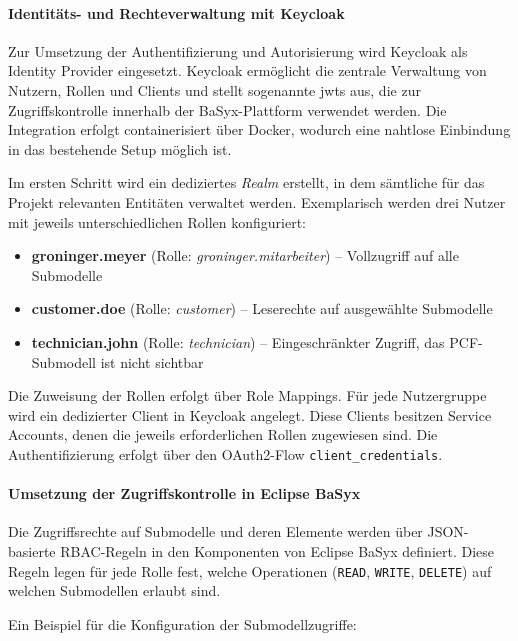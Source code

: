 \paragraph{Identitäts- und Rechteverwaltung mit Keycloak}

Zur Umsetzung der Authentifizierung und Autorisierung wird Keycloak als Identity Provider eingesetzt. Keycloak ermöglicht die zentrale Verwaltung von Nutzern, Rollen und Clients und stellt sogenannte \acsp{jwt} aus, die zur Zugriffskontrolle innerhalb der BaSyx-Plattform verwendet werden. Die Integration erfolgt containerisiert über Docker, wodurch eine nahtlose Einbindung in das bestehende Setup möglich ist.

Im ersten Schritt wird ein dediziertes \textit{Realm} erstellt, in dem sämtliche für das Projekt relevanten Entitäten verwaltet werden. Exemplarisch werden drei Nutzer mit jeweils unterschiedlichen Rollen konfiguriert:

\begin{itemize}[noitemsep, leftmargin=*]
    \item \textbf{groninger.meyer} (Rolle: \textit{groninger.mitarbeiter}) – Vollzugriff auf alle Submodelle
    \item \textbf{customer.doe} (Rolle: \textit{customer}) – Leserechte auf ausgewählte Submodelle
    \item \textbf{technician.john} (Rolle: \textit{technician}) – Eingeschränkter Zugriff, das PCF-Submodell ist nicht sichtbar
\end{itemize}

Die Zuweisung der Rollen erfolgt über Role Mappings. Für jede Nutzergruppe wird ein dedizierter Client in Keycloak angelegt. Diese Clients besitzen Service Accounts, denen die jeweils erforderlichen Rollen zugewiesen sind. Die Authentifizierung erfolgt über den OAuth2-Flow \texttt{client\_credentials}.

\paragraph{Umsetzung der Zugriffskontrolle in Eclipse BaSyx}

Die Zugriffsrechte auf Submodelle und deren Elemente werden über JSON-basierte RBAC-Regeln in den Komponenten von Eclipse BaSyx definiert. Diese Regeln legen für jede Rolle fest, welche Operationen (\texttt{READ}, \texttt{WRITE}, \texttt{DELETE}) auf welchen Submodellen erlaubt sind.

Ein Beispiel für die Konfiguration der Submodellzugriffe:

